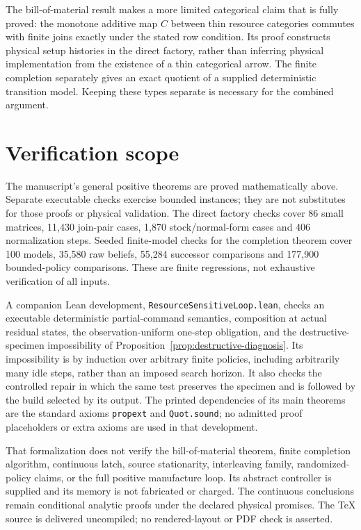 \documentclass[11pt]{article}
\theoremstyle{definition}
\theoremstyle{remark}
\begin{document}
The bill-of-material result makes a more limited categorical claim that
is fully proved: the monotone additive map $C$ between thin resource
categories commutes with finite joins exactly under the stated row
condition. Its proof constructs physical setup histories in the direct
factory, rather than inferring physical implementation from the existence
of a thin categorical arrow. The finite completion separately gives an
exact quotient of a supplied deterministic transition model. Keeping
these types separate is necessary for the combined argument.



\section{Verification scope}\label{sec:verification}
The manuscript's general positive theorems are proved mathematically
above. Separate executable checks exercise bounded instances; they are
not substitutes for those proofs or physical validation. The direct
factory checks cover 86 small matrices, 11,430 join-pair cases, 1,870
stock/normal-form cases and 406 normalization steps. Seeded finite-model
checks for the completion theorem cover 100 models, 35,580 raw beliefs,
55,284 successor comparisons and 177,900 bounded-policy comparisons.
These are finite regressions, not exhaustive verification of all inputs.

A companion Lean development, \texttt{ResourceSensitiveLoop.lean}, checks
an executable deterministic partial-command semantics, composition at
actual residual states, the observation-uniform one-step obligation, and
the destructive-specimen impossibility of
Proposition~\ref{prop:destructive-diagnosis}. Its impossibility is by
induction over arbitrary finite policies, including arbitrarily many
idle steps, rather than an imposed search horizon. It also checks the
controlled repair in which the same test preserves the specimen and is
followed by the build selected by its output. The printed dependencies of its main theorems are the standard axioms
\texttt{propext} and \texttt{Quot.sound}; no admitted proof placeholders or
extra axioms are used in that development.

That formalization does not verify the bill-of-material theorem, finite
completion algorithm, continuous latch, source stationarity, interleaving
family, randomized-policy claims, or the full positive manufacture loop.
Its abstract controller is supplied and its memory is not fabricated or
charged. The continuous conclusions remain conditional analytic proofs
under the declared physical promises. The TeX source is delivered
uncompiled; no rendered-layout or PDF check is asserted.
\end{document}
